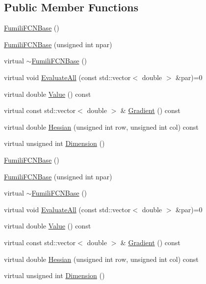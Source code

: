 \subsection*{Public Member Functions}
\begin{DoxyCompactItemize}
\item 
\mbox{\hyperlink{classROOT_1_1Minuit2_1_1FumiliFCNBase_a118a4f34ec003713b719671842f5c6a2}{Fumili\+F\+C\+N\+Base}} ()
\item 
\mbox{\hyperlink{classROOT_1_1Minuit2_1_1FumiliFCNBase_ad20bc861c81429cd75a0b14d5449f066}{Fumili\+F\+C\+N\+Base}} (unsigned int npar)
\item 
virtual \mbox{\hyperlink{classROOT_1_1Minuit2_1_1FumiliFCNBase_a94961223a3baa0a131461be70a55a4e3}{$\sim$\+Fumili\+F\+C\+N\+Base}} ()
\item 
virtual void \mbox{\hyperlink{classROOT_1_1Minuit2_1_1FumiliFCNBase_a0741bb4a7405cc33ab60583472a189cb}{Evaluate\+All}} (const std\+::vector$<$ double $>$ \&par)=0
\item 
virtual double \mbox{\hyperlink{classROOT_1_1Minuit2_1_1FumiliFCNBase_a221dacee0ccde747a271a0cecd759f98}{Value}} () const
\item 
virtual const std\+::vector$<$ double $>$ \& \mbox{\hyperlink{classROOT_1_1Minuit2_1_1FumiliFCNBase_ad226939ea2e83f754b5a6afc30876d3e}{Gradient}} () const
\item 
virtual double \mbox{\hyperlink{classROOT_1_1Minuit2_1_1FumiliFCNBase_ade134d8c6613393e942ef98d445db376}{Hessian}} (unsigned int row, unsigned int col) const
\item 
virtual unsigned int \mbox{\hyperlink{classROOT_1_1Minuit2_1_1FumiliFCNBase_ab8056ffdfd619915e22f1310db0644a6}{Dimension}} ()
\item 
\mbox{\hyperlink{classROOT_1_1Minuit2_1_1FumiliFCNBase_a118a4f34ec003713b719671842f5c6a2}{Fumili\+F\+C\+N\+Base}} ()
\item 
\mbox{\hyperlink{classROOT_1_1Minuit2_1_1FumiliFCNBase_ad20bc861c81429cd75a0b14d5449f066}{Fumili\+F\+C\+N\+Base}} (unsigned int npar)
\item 
virtual \mbox{\hyperlink{classROOT_1_1Minuit2_1_1FumiliFCNBase_a94961223a3baa0a131461be70a55a4e3}{$\sim$\+Fumili\+F\+C\+N\+Base}} ()
\item 
virtual void \mbox{\hyperlink{classROOT_1_1Minuit2_1_1FumiliFCNBase_a0741bb4a7405cc33ab60583472a189cb}{Evaluate\+All}} (const std\+::vector$<$ double $>$ \&par)=0
\item 
virtual double \mbox{\hyperlink{classROOT_1_1Minuit2_1_1FumiliFCNBase_a221dacee0ccde747a271a0cecd759f98}{Value}} () const
\item 
virtual const std\+::vector$<$ double $>$ \& \mbox{\hyperlink{classROOT_1_1Minuit2_1_1FumiliFCNBase_ad226939ea2e83f754b5a6afc30876d3e}{Gradient}} () const
\item 
virtual double \mbox{\hyperlink{classROOT_1_1Minuit2_1_1FumiliFCNBase_ade134d8c6613393e942ef98d445db376}{Hessian}} (unsigned int row, unsigned int col) const
\item 
virtual unsigned int \mbox{\hyperlink{classROOT_1_1Minuit2_1_1FumiliFCNBase_ab8056ffdfd619915e22f1310db0644a6}{Dimension}} ()
\end{DoxyCompactItemize}
